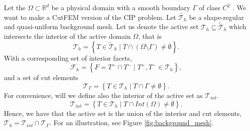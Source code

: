 Let the $\Omega  \subset \mathbb{R} ^{d} $ be a physical domain with a smooth boundary $\Gamma  $ of class $C^{2}$ .
We want to make a CutFEM version of the CIP problem. Let $\widetilde{\mathcal{T}_{h} } $ be a shape-regular and quasi-uniform background mesh. Let us denote the active set $\mathcal{T} _{h} \subseteq \widetilde{\mathcal{T}}_{h}$ which intersects the interior of the active domain $\Omega $, that is  \[
\mathcal{T} _{h} = \left\{ T \in \widetilde{\mathcal{T} }_{h}  \mid  T \cap (\Omega \setminus \Gamma ) \neq \emptyset    \right\} .
\]
With a corresponding set of interior facets, \[
    \mathcal{F} _{h} = \left\{ F = T^{+} \cap T^{-}  \mid  T^{+}, T^{-} \in \mathcal{T} _{h} \right\},
\]
and a set of cut elements \[
\mathcal{T} _{\Gamma } = \left\{ T \in \mathcal{T} _{h}   \mid  T \cap \Gamma \neq \emptyset  \right\}.
\]
For convenience, will we define also the interior of the active set as $\mathcal{T} _{int}$.
\[
\mathcal{T} _{int} = \left\{ T \in \mathcal{T} _{h}   \mid  T \cap  Int(\Omega ) \neq \emptyset  \right\}.
\]
Hence, we have that the active set is the union of the interior and cut elements, $\mathcal{T} _{h} = \mathcal{T} _{int} \cap \mathcal{T} _{\Gamma }$. For an illustration, see Figure \ref{fig:background_mesh}.



